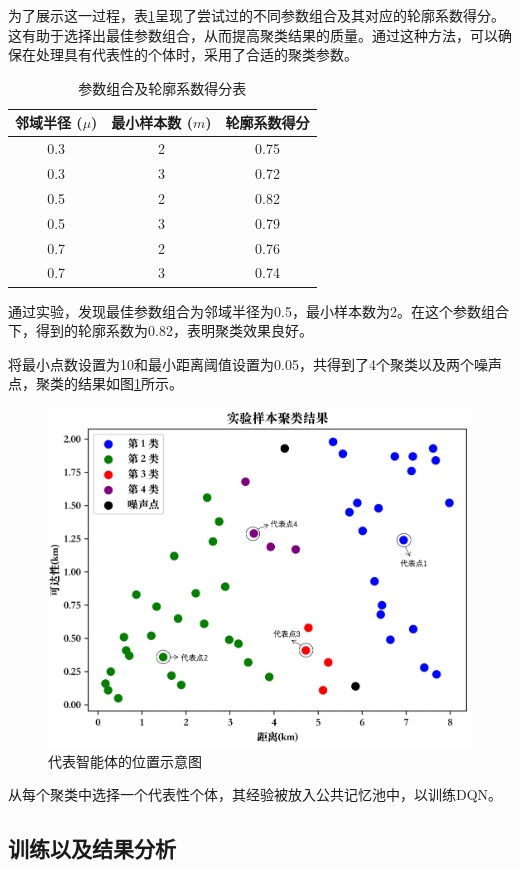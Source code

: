 为了展示这一过程，表\ref{tab_cluster}呈现了尝试过的不同参数组合及其对应的轮廓系数得分。这有助于选择出最佳参数组合，从而提高聚类结果的质量。通过这种方法，可以确保在处理具有代表性的个体时，采用了合适的聚类参数。

\renewcommand{\arraystretch}{1.2} %
\setlength{\tabcolsep}{8mm}
\begin{table}[htbp]
\centering
\caption{参数组合及轮廓系数得分表}
\label{tab_cluster}
\begin{tabular}{ccc}
\toprule
邻域半径 ($\mu$) & 最小样本数 ($m$) & 轮廓系数得分       \\
\midrule
0.3 & 2 & 0.75 \\ 
0.3 & 3 & 0.72 \\ 
0.5 & 2 & 0.82 \\ 
0.5 & 3 & 0.79 \\ 
0.7 & 2 & 0.76 \\ 
0.7 & 3 & 0.74 \\ 

\bottomrule
\end{tabular}
\end{table}

通过实验，发现最佳参数组合为邻域半径为0.5，最小样本数为2。在这个参数组合下，得到的轮廓系数为0.82，表明聚类效果良好。

将最小点数设置为10和最小距离阈值设置为0.05，共得到了4个聚类以及两个噪声点，聚类的结果如图\ref{db_cluster}所示。
\begin{figure}[H]
  \centering
  \includegraphics[width=.75\linewidth]{figures/content/db_cluster.png}
  \caption{代表智能体的位置示意图}
  \label{db_cluster}
\end{figure}


从每个聚类中选择一个代表性个体，其经验被放入公共记忆池中，以训练DQN。
\subsection{训练以及结果分析}

